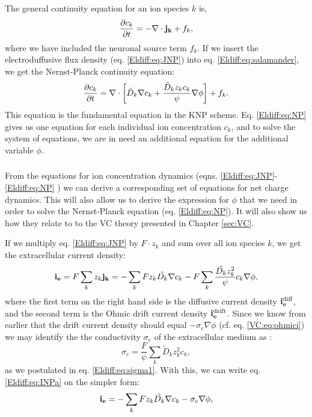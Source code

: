 The general continuity equation for an ion species $k$ is,
\begin{equation}
\frac{\partial c_k}{\partial t} = - \nabla \cdot {\bf j_k} + f_k,
\label{Eldiff:eq:salamander}
\end{equation}
where we have included the neuronal source term $f_k$. If we insert the electroduffusive flux density (eq. \ref{Eldiff:eq:JNP}) into eq. \ref{Eldiff:eq:salamander}, we get the Nernst-Planck continuity equation:
\begin{equation}
\frac{\partial c_k}{\partial t} = {\bf \nabla} \cdot \left[ \tilde{D}_k {\bf \nabla} c_k + \frac{\tilde{D}_k z_k c_k}{\psi} {\bf \nabla} \phi \right] + f_k.
\label{Eldiff:eq:NP}
\end{equation}
This equation is the fundamental equation in the KNP scheme. Eq. \ref{Eldiff:eq:NP} gives us one equation for each individual ion concentration $c_k$, and to solve the system of equations, we are in need an additional equation for the additional variable $\phi$. 


\subsubsection{}
\label{sec:Eldiff:electrodynamics}
From the equations for ion concentration dynamics (eqns. \ref{Eldiff:eq:JNP}-\ref{Eldiff:eq:NP} ) we can derive a corresponding set of equations for net charge dynamics. This will also allow us to derive the expression for $\phi$ that we need in order to solve the Nernst-Planck equation (eq. \ref{Eldiff:eq:NP}).  It will also show us how they relate to to the VC theory presented in Chapter \ref{sec:VC}.

If we multiply eq. \ref{Eldiff:eq:JNP} by $F\cdot z_k$ and sum over all ion species $k$, we get the extracellular current density:
\begin{equation}
{\bf i_e} = F\sum_k {z_k {\bf j_k}} = -\sum_k{F z_k \tilde{D_k}{\bf \nabla} c_{k}} - F\sum_{k} \frac{\tilde{D_k} z_{k}^2}{\psi}c_{k} {\bf \nabla}{\phi}, 
\label{Eldiff:eq:INPa}
\end{equation}
where the first term on the right hand side is the diffusive current density ${\bf i_e^\text{diff}}$, and the second term is the Ohmic drift current density ${\bf i_e^\text{drift}}$. Since we know from earlier that the drift current density should equal $- \sigma_e \nabla \phi$  (cf. eq. \ref{VC:eq:ohmici}) we may identify the the conductivity $\sigma_e$ of the extracellular medium as \citep{Koch1999}:
\begin{equation}
\sigma_e = \frac{F}{\psi}\sum_{k} \tilde{D}_k z_{k}^2 c_{k},
\label{Eldiff:eq:sigma}
\end{equation}
as we postulated in eq. \ref{Eldiff:eq:sigma1}. With this, we can write eq. \ref{Eldiff:eq:INPa} on the simpler form:
\begin{equation}
{\bf i_e} = - \sum_k{F z_k \tilde{D_k}{\bf \nabla} c_{k}} - \sigma_e{\bf \nabla}{\phi},
\label{Eldiff:eq:INP}
\end{equation}

